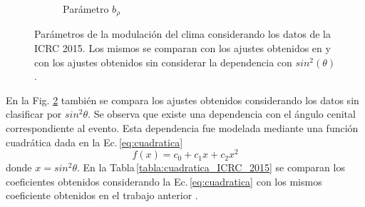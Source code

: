 \begin{figure}[H]
\begin{subfigure}[b]{\textwidth}
                    \caption{Parámetro  $b_{\rho}$	 }
                    \label{fig:brho_2015}
                    \end{subfigure}%
                    \caption{Parámetros de la modulación del clima considerando los datos de la ICRC 2015. Los mismos se comparan con los ajustes obtenidos en \cite{aab2017impact} y con los ajustes obtenidos sin considerar la dependencia con $sin^2(\theta)$. }\label{fig:parameters_old}
                \end{figure}
            En la Fig. \ref{fig:parameters_old} también se compara los ajustes obtenidos considerando los datos sin clasificar por $sin^2\theta$. Se observa que existe una dependencia con el ángulo cenital correspondiente al evento. Esta dependencia fue modelada mediante una función cuadrática dada en la Ec.\,\ref{eq:cuadratica}
            \begin{equation}
                f(x) = c_0 + c_1x + c_2x^2
                \label{eq:cuadratica}
            \end{equation}
            donde $x=sin^2\theta$.  En la Tabla\,\ref{tabla:cuadratica_ICRC_2015} se comparan los coeficientes obtenidos considerando la Ec.\,\ref{eq:cuadratica} con los mismos coeficiente obtenidos en el trabajo anterior \cite{aab2017impact}. 

